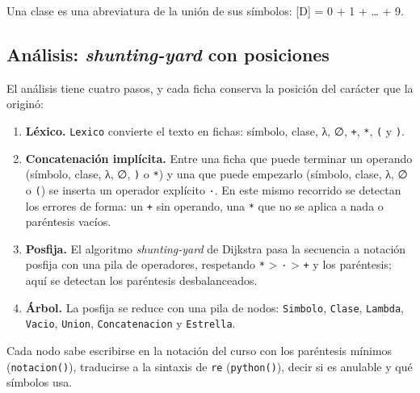Una clase es una abreviatura de la unión de sus símbolos: {[}D{]} = 0 + 1 + \ldots{} + 9.

\hypertarget{anuxe1lisis-shunting-yard-con-posiciones}{%
\subsection{\texorpdfstring{Análisis: \emph{shunting-yard} con posiciones}{Análisis: shunting-yard con posiciones}}\label{anuxe1lisis-shunting-yard-con-posiciones}}

El análisis tiene cuatro pasos, y cada ficha conserva la posición del carácter que la originó:

\begin{enumerate}
\def\labelenumi{\arabic{enumi}.}
\tightlist
\item
  \textbf{Léxico.} \texttt{Lexico} convierte el texto en fichas: símbolo, clase, λ, ∅, \texttt{+}, \texttt{*}, \texttt{(} y \texttt{)}.
\item
  \textbf{Concatenación implícita.} Entre una ficha que puede terminar un operando (símbolo, clase, λ, ∅, \texttt{)} o \texttt{*}) y una que puede empezarlo (símbolo, clase, λ, ∅ o \texttt{(}) se inserta un operador explícito \texttt{·}. En este mismo recorrido se detectan los errores de forma: un \texttt{+} sin operando, una \texttt{*} que no se aplica a nada o paréntesis vacíos.
\item
  \textbf{Posfija.} El algoritmo \emph{shunting-yard} de Dijkstra pasa la secuencia a notación posfija con una pila de operadores, respetando \texttt{*} \textgreater{} \texttt{·} \textgreater{} \texttt{+} y los paréntesis; aquí se detectan los paréntesis desbalanceados.
\item
  \textbf{Árbol.} La posfija se reduce con una pila de nodos: \texttt{Simbolo}, \texttt{Clase}, \texttt{Lambda}, \texttt{Vacio}, \texttt{Union}, \texttt{Concatenacion} y \texttt{Estrella}.
\end{enumerate}

Cada nodo sabe escribirse en la notación del curso con los paréntesis mínimos (\texttt{notacion()}), traducirse a la sintaxis de \texttt{re} (\texttt{python()}), decir si es anulable y qué símbolos usa.

